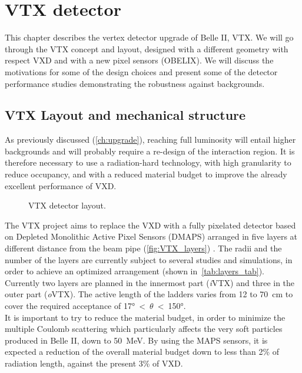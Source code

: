 \chapter{VTX detector} \label{ch:VTX}


This chapter describes the vertex detector upgrade of Belle II, VTX. We will go through the VTX concept and layout, designed with a different geometry with respect VXD and with a new pixel sensors (OBELIX). We will discuss the motivations for some of the design choices and present some of the detector performance studies demonstrating the robustness against backgrounds.


\section{VTX Layout and mechanical structure}

As previously discussed (\autoref{ch:upgrade}), reaching full luminosity will entail higher backgrounds and will probably require a re-design of the interaction region. It is therefore necessary to use a radiation-hard technology, with high granularity to reduce occupancy, and with a reduced material budget to improve the already excellent performance of VXD.


\begin{figure}[h!]
\centering
{}
\caption{VTX detector layout.}
\label{fig:VTX_layers}
\end{figure}


The VTX project aims to replace the VXD with a fully pixelated detector based on Depleted Monolithic Active Pixel Sensors (DMAPS) arranged in five layers at different distance from the beam pipe (\autoref{fig:VTX_layers}) \cite{BelleIIVTX:2023szr, F.Forti:3930}. The radii and the number of the layers are currently subject to several  studies and simulations, in order to achieve an optimized arrangement (shown in~\autoref{tab:layers_tab}). 
Currently two layers are planned in the innermost part (\textit{i}VTX) and three in the outer part (\textit{o}VTX). The active length of the ladders varies from 12 to \SI{70}{cm} to cover the required acceptance of \ang{17}~<~$\theta$~<~\ang{150}.\\
It is important to try to reduce the material budget, in order to minimize the multiple Coulomb scattering which particularly affects the very soft particles produced in Belle II, down to \SI{50}{MeV}. By using the MAPS sensors, it is expected a reduction of the overall material budget down to less than 2\% of radiation length, against the present 3\% of VXD.

